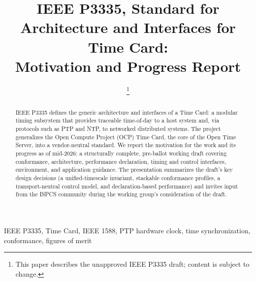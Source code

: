 \documentclass[conference,a4paper]{IEEEtran}
\begin{document}
\title{IEEE P3335, Standard for Architecture and Interfaces for Time Card:\\ Motivation and Progress Report}

\author{
\and
{}
\and
{}
\and
{}
\thanks{This paper describes the unapproved IEEE P3335 draft; content
is subject to change.}
}

\maketitle

\begin{abstract}
IEEE P3335 defines the generic architecture and interfaces of a Time Card:
a modular timing subsystem that provides traceable time-of-day to a host
system and, via protocols such as PTP and NTP, to networked distributed
systems. The project generalizes the Open Compute Project (OCP) Time Card,
the core of the Open Time Server, into a vendor-neutral standard. We report
the motivation for the work and its progress as of mid-2026: a structurally
complete, pre-ballot working draft covering conformance, architecture,
performance declaration, timing and control interfaces, environment, and
application guidance. The presentation summarizes the draft's key design
decisions (a unified-timescale invariant, stackable conformance profiles,
a transport-neutral control model, and declaration-based performance) and
invites input from the ISPCS community during the working group's 
consideration of the draft.
\end{abstract}

\begin{IEEEkeywords}
IEEE P3335, Time Card, IEEE 1588, PTP hardware clock, time synchronization,
conformance, figures of merit
\end{IEEEkeywords}
\end{document}
